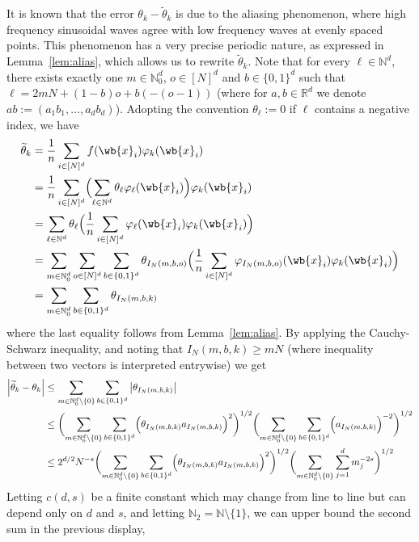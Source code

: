 \documentclass{article}
\newcommand{\Reals}{\mathbb{R}}
\newcommand{\abs}[1]{\left \lvert #1 \right \rvert}
\newcommand{\1}{\mathbf{1}}
\newcommand{\Nbb}{\mathbb{N}}
\newcommand{\wt}[1]{\widetilde{#1}}
\theoremstyle{alden}
\theoremstyle{aldenthm}
\theoremstyle{definition}
\theoremstyle{remark}
\begin{document}
It is known that the error $\theta_k - \wt{\theta}_k$ is due to the aliasing phenomenon, where high frequency sinusoidal waves agree with low frequency waves at evenly spaced points. This phenomenon has a very precise periodic nature, as expressed in Lemma~\ref{lem:alias}, which allows us to rewrite $\wt{\theta}_k$. Note that for every $\ell \in \mathbb{N}^d$, there exists exactly one $m \in \mathbb{N}_0^d$, $o \in [N]^d$ and $b \in \{0,1\}^d$ such that $\ell = 2mN + (1 - b)o + b(-(o - 1))$ (where for $a,b \in \Reals^d$ we denote $ab := (a_1b_1,\ldots,a_db_d)$). Adopting the convention $\theta_{\ell} := 0$ if $\ell$ contains a negative index, we have
\begin{align*}
\wt{\theta}_k & = \frac{1}{n} \sum_{i \in [N]^d} f(\wb{x}_i) \varphi_k(\wb{x}_i) \\
& = \frac{1}{n} \sum_{i \in [N]^d} \Bigl(\sum_{\ell \in \Nbb^d} \theta_{\ell} \varphi_{\ell}(\wb{x}_i) \Bigr) \varphi_k(\wb{x}_i) \\
& = \sum_{\ell \in \mathbb{N}^d} \theta_{\ell} \Bigl(\frac{1}{n} \sum_{i \in [N]^d} \varphi_{\ell}(\wb{x}_i) \varphi_{k}(\wb{x}_i)\Bigr) \\
& = \sum_{m \in \mathbb{N}_0^d} \sum_{o \in [N]^d}\sum_{b \in \{0,1\}^d} \theta_{I_N(m,b,o)}  \Bigl(\frac{1}{n} \sum_{i \in [N]^d} \varphi_{I_N(m,b,o)}(\wb{x}_i) \varphi_{k}(\wb{x}_i)\Bigr) \\
& = \sum_{m \in \mathbb{N}_0^d} \sum_{b \in \{0,1\}^d} \theta_{I_N(m,b,k)} 
\end{align*}
where the last equality follows from Lemma~\ref{lem:alias}. By applying the Cauchy-Schwarz inequality, and noting that $I_N(m,b,k) \geq mN$ (where inequality between two vectors is interpreted entrywise) we get
\begin{align*}
\abs{\wt{\theta}_k - \theta_k} & \leq \sum_{m \in \Nbb_0^d \setminus \{0\}} \sum_{b \in \{0,1\}^d} \abs{\theta_{I_N(m,b,k)}} \\
& \leq \biggl(\sum_{m \in \Nbb_0^d \setminus \{0\}} \sum_{b \in \{0,1\}^d} \Bigl(\theta_{I_N(m,b,k)}a_{I_N(m,b,k)}\Bigr)^2 \biggr)^{1/2} \biggl(\sum_{m \in \Nbb_0^d \setminus \{0\}} \sum_{b \in \{0,1\}^d} \Bigl(a_{I_N(m,b,k)}\Bigr)^{-2} \biggr)^{1/2} \\
& \leq 2^{d/2}N^{-s } \biggl(\sum_{m \in \Nbb_0^d \setminus \{0\}} \sum_{b \in \{0,1\}^d} \Bigl(\theta_{I_N(m,b,k)}a_{I_N(m,b,k)}\Bigr)^2 \biggr)^{1/2} \biggl(\sum_{m \in \Nbb_0^d \setminus \{0\}}\sum_{j = 1}^{d} m_j^{-2s} \biggr)^{1/2} 
\end{align*}
Letting $c(d,s)$ be a finite constant which may change from line to line but can depend only on $d$ and $s$, and letting $\Nbb_2 = \Nbb \setminus \{1\}$, we can upper bound the second sum in the previous display,
\end{document}
